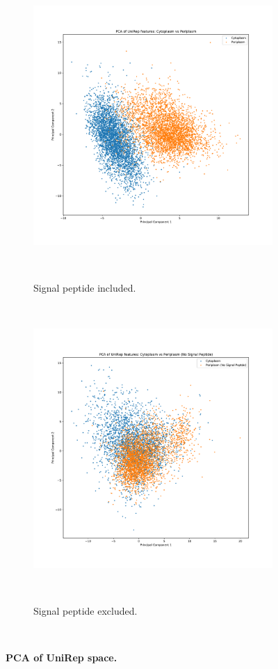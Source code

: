 ~\begin{figure}[h!]
	~\begin{subfigure}[b]{0.49\linewidth}
		\includegraphics[width=\linewidth]{./results/UniRep/img/pca.pdf}
		\caption{Signal peptide included.}
		\label{fig:pca_sp}
	~\end{subfigure}
	~\begin{subfigure}[b]{0.49\linewidth}
		\includegraphics[width=\linewidth]{./results/UniRep/img/pca_without_sp.pdf}
		\caption{Signal peptide excluded.}
		\label{fig:pca_without_sp}
	~\end{subfigure}
	\caption{\textbf{PCA of UniRep space.}}
	\label{fig:pca}
~\end{figure}

